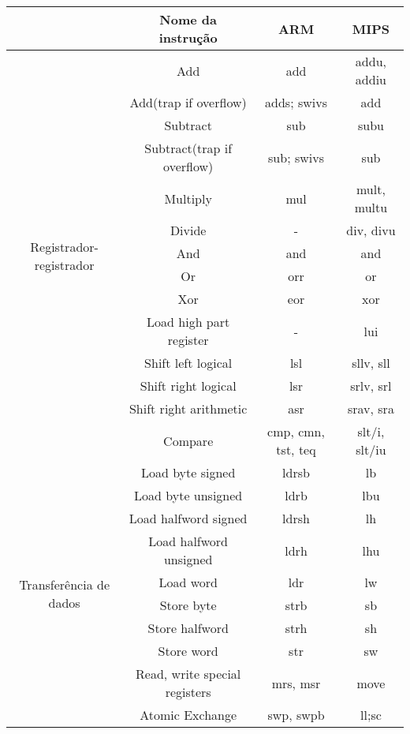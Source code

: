 \begin{table}[H]
	\begin{tabular}{c|c|c|c}
		& \textbf{Nome da instrução} & \textbf{ARM}& \textbf{MIPS} \\\hline
		\multirow{14}[0]{*}{Registrador-registrador} & Add   & add   & addu, addiu \\
		& Add(trap if overflow) & adds; swivs & add \\
		& Subtract & sub   & subu \\
		& Subtract(trap if overflow) & sub; swivs & sub \\
		& Multiply & mul   & mult, multu \\
		& Divide & -     & div, divu \\
		& And   & and   & and \\
		&  Or   & orr   & or \\
		& Xor   & eor   & xor \\
		& Load high part register & -     & lui \\
		& Shift left logical & lsl   & sllv, sll \\
		& Shift right logical & lsr   & srlv, srl \\
		& Shift right arithmetic & asr   & srav, sra \\
		& Compare & cmp, cmn, tst, teq & slt/i, slt/iu \\\hline
		\multirow{10}[0]{*}{Transferência de dados} & Load byte signed & ldrsb & lb \\
		& Load byte unsigned & ldrb  & lbu \\
		& Load halfword signed & ldrsh & lh \\
		& Load halfword unsigned & ldrh  & lhu \\
		& Load word & ldr   & lw \\
		& Store byte & strb  & sb \\
		& Store halfword & strh  & sh \\
		& Store word & str   & sw \\
		& Read, write special registers & mrs, msr & move \\
		& Atomic Exchange & swp, swpb & ll;sc \\
	\end{tabular}%
\end{table}%

